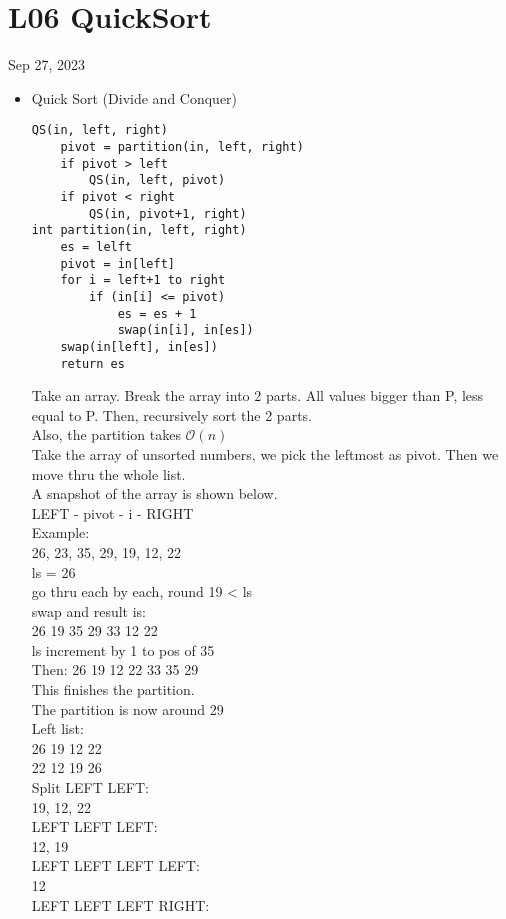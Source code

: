 \section{L06 QuickSort}
Sep 27, 2023
\begin{itemize}
	\item Quick Sort (Divide and Conquer)
		\begin{lstlisting}
QS(in, left, right)
	pivot = partition(in, left, right)
	if pivot > left
		QS(in, left, pivot)
	if pivot < right
		QS(in, pivot+1, right)
int partition(in, left, right)
	es = lelft
	pivot = in[left]
	for i = left+1 to right
		if (in[i] <= pivot)
			es = es + 1
			swap(in[i], in[es])
	swap(in[left], in[es])
	return es
		\end{lstlisting}
	\begin{example}
		Take an array. Break the array into 2 parts. All values bigger than P, less equal to P. Then, recursively sort the 2 parts.\\ Also, the partition takes $\mathcal O(n)$\\
		Take the array of unsorted numbers, we pick the leftmost as pivot. Then we move thru the whole list.\\
		A snapshot of the array is shown below.\\
		LEFT - pivot - i - RIGHT\\
		Example:\\
		26, 23, 35, 29, 19, 12, 22\\
		ls = 26\\
		go thru each by each, round 19 < ls\\
		swap and result is:\\
		26 19 35 29 33 12 22\\
		ls increment by 1 to pos of 35\\
		Then:
		26 19 12 22 33 35 29\\
		This finishes the partition.\\
		The partition is now around 29\\
		Left list:\\
		26 19 12 22\\
		22 12 19 26\\
		Split LEFT LEFT:\\
		19, 12, 22\\
		LEFT LEFT LEFT:\\
		12, 19\\
		LEFT LEFT LEFT LEFT:\\
		12\\
		LEFT LEFT LEFT RIGHT:\\

\end{example}
\end{itemize}
